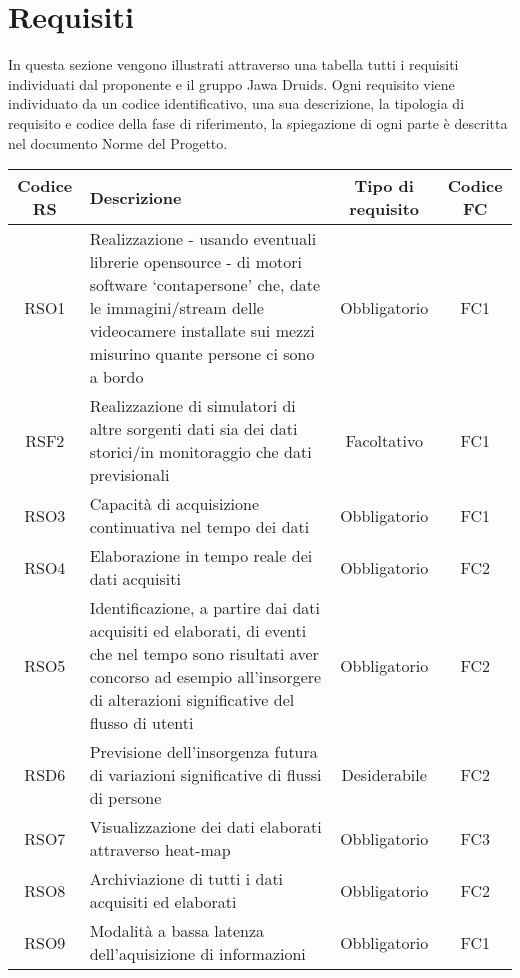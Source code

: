 \chapter{Requisiti}
In questa sezione vengono illustrati attraverso una tabella tutti i requisiti individuati dal proponente e il gruppo Jawa Druids. Ogni requisito viene individuato da un codice identificativo, una sua descrizione, la tipologia di requisito e codice della fase di riferimento, la spiegazione di ogni parte è descritta nel documento Norme del Progetto. 

\def\tabularxcolumn#1{m{#1}}
{
	
	\begin{center}
		\renewcommand{\arraystretch}{1.4}
		\begin{tabularx}{\textwidth}{ |c|X|c|c| }
			\hline
			\rowcolor{Melon}
			\textbf{Codice RS} & \textbf{Descrizione} & \textbf{Tipo di requisito} & \textbf{Codice FC} \\
			\hline
			RSO1 & Realizzazione - usando eventuali librerie opensource - di motori software ‘contapersone’ che, date le
			immagini/stream delle videocamere installate sui mezzi misurino quante persone ci sono a bordo  & Obbligatorio & FC1  \\
			\hline
			RSF2 & Realizzazione di simulatori di altre sorgenti dati sia dei dati storici/in monitoraggio che dati previsionali & Facoltativo & FC1 \\
			\hline
			RSO3 & Capacità di acquisizione continuativa nel tempo dei dati  & Obbligatorio & FC1   \\
			\hline
			RSO4 & Elaborazione in tempo reale dei dati acquisiti & Obbligatorio & FC2  \\
			\hline
			RSO5 & Identificazione, a partire dai dati acquisiti ed elaborati, di eventi che nel tempo sono risultati aver
			concorso ad esempio all’insorgere di alterazioni significative del flusso di utenti & Obbligatorio & FC2  \\
			\hline
			RSD6 & Previsione dell’insorgenza futura di variazioni significative di flussi di persone & Desiderabile & FC2  \\
			\hline
			RSO7 & Visualizzazione dei dati elaborati attraverso heat-map & Obbligatorio & FC3  \\
			\hline
			RSO8 & Archiviazione di tutti i dati acquisiti ed elaborati & Obbligatorio & FC2  \\
			\hline
			RSO9 & Modalità a bassa latenza dell'aquisizione di informazioni & Obbligatorio & FC1 \\


\end{tabularx}
\end{center}}

